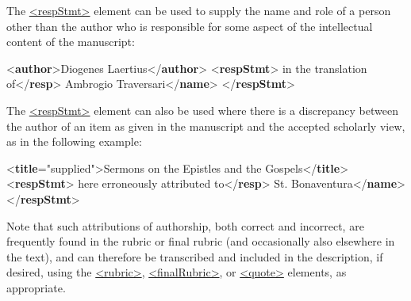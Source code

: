 The \hyperref[TEI.respStmt]{<respStmt>} element can be used to supply the name and role of a person other than the author who is responsible for some aspect of the intellectual content of the manuscript: \par\bgroup{}\exampleFont \begin{shaded}\noindent\mbox{}{<\textbf{author}>}Diogenes Laertius{</\textbf{author}>}\mbox{}\newline 
{<\textbf{respStmt}>}\mbox{}\newline 
{}in the translation of{</\textbf{resp}>}\mbox{}\newline 
{}Ambrogio Traversari{</\textbf{name}>}\mbox{}\newline 
{</\textbf{respStmt}>}\end{shaded}\egroup\par \par
The \hyperref[TEI.respStmt]{<respStmt>} element can also be used where there is a discrepancy between the author of an item as given in the manuscript and the accepted scholarly view, as in the following example: \par\bgroup{}\exampleFont \begin{shaded}\noindent\mbox{}{<\textbf{title}\hspace*{1em}{type}="{supplied}">}Sermons on the Epistles and the Gospels{</\textbf{title}>}\mbox{}\newline 
{<\textbf{respStmt}>}\mbox{}\newline 
{}here erroneously attributed to{</\textbf{resp}>}\mbox{}\newline 
{}St. Bonaventura{</\textbf{name}>}\mbox{}\newline 
{</\textbf{respStmt}>}\end{shaded}\egroup\par \noindent  Note that such attributions of authorship, both correct and incorrect, are frequently found in the rubric or final rubric (and occasionally also elsewhere in the text), and can therefore be transcribed and included in the description, if desired, using the \hyperref[TEI.rubric]{<rubric>}, \hyperref[TEI.finalRubric]{<finalRubric>}, or \hyperref[TEI.quote]{<quote>} elements, as appropriate.
